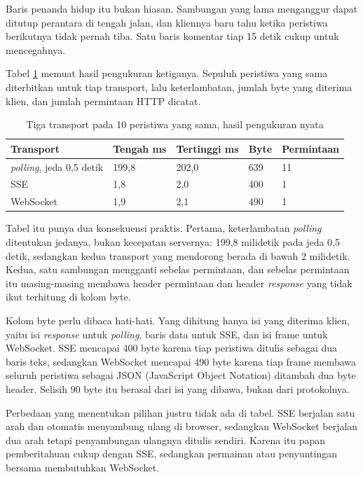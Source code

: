 Baris penanda hidup itu bukan hiasan. Sambungan yang lama menganggur dapat
ditutup perantara di tengah jalan, dan kliennya baru tahu ketika peristiwa
berikutnya tidak pernah tiba. Satu baris komentar tiap 15 detik cukup untuk
mencegahnya.

Tabel \ref{tab:transport} memuat hasil pengukuran ketiganya. Sepuluh
peristiwa yang sama diterbitkan untuk tiap transport, lalu keterlambatan,
jumlah byte yang diterima klien, dan jumlah permintaan HTTP dicatat.

\begin{table}[!htb]
  \centering
  \caption{Tiga transport pada 10 peristiwa yang sama, hasil pengukuran
           nyata}
  \label{tab:transport}
  \begin{tabularx}{\textwidth}{Xllll}
    \hline
    \textbf{Transport} & \textbf{Tengah ms} & \textbf{Tertinggi ms} & \textbf{Byte} & \textbf{Permintaan} \\
    \hline
    \textit{polling}, jeda 0,5 detik & 199,8 & 202,0 & 639 & 11 \\
    \hline
    SSE & 1,8 & 2,0 & 400 & 1 \\
    \hline
    WebSocket & 1,9 & 2,1 & 490 & 1 \\
    \hline
  \end{tabularx}
\end{table}

Tabel itu punya dua konsekuensi praktis. Pertama, keterlambatan
\textit{polling} ditentukan jedanya, bukan kecepatan servernya: 199,8
milidetik pada jeda 0,5 detik, sedangkan kedua transport yang mendorong
berada di bawah 2 milidetik. Kedua, satu sambungan mengganti sebelas
permintaan, dan sebelas permintaan itu masing-masing membawa header
permintaan dan header \textit{response} yang tidak ikut terhitung di kolom byte.

Kolom byte perlu dibaca hati-hati. Yang dihitung hanya isi yang diterima
klien, yaitu isi \textit{response} untuk \textit{polling}, baris data untuk SSE, dan
isi frame untuk WebSocket. SSE mencapai 400 byte karena tiap peristiwa
ditulis sebagai dua baris teks, sedangkan WebSocket mencapai 490 byte karena
tiap frame membawa seluruh peristiwa sebagai JSON (JavaScript Object
Notation) ditambah dua byte header. Selisih 90 byte itu berasal dari isi yang
dibawa, bukan dari protokolnya.

Perbedaan yang menentukan pilihan justru tidak ada di tabel. SSE berjalan
satu arah dan otomatis menyambung ulang di browser, sedangkan WebSocket
berjalan dua arah tetapi penyambungan ulangnya ditulis sendiri. Karena itu
papan pemberitahuan cukup dengan SSE, sedangkan permainan atau penyuntingan
bersama membutuhkan WebSocket.

